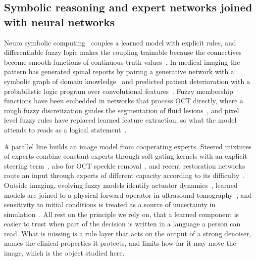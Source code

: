 \subsection{Symbolic reasoning and expert networks joined with neural networks}
Neuro symbolic computing~\cite{garcez2023neurosymbolic} couples a learned model with explicit rules,
and differentiable fuzzy logic makes the coupling trainable because the connectives become smooth
functions of continuous truth values~\cite{vankrieken2022analyzing}. In medical imaging the pattern
has generated spinal reports by pairing a generative network with a symbolic graph of domain
knowledge~\cite{han2021unifying} and predicted patient deterioration with a probabilistic logic
program over convolutional features~\cite{fadja2022neural}. Fuzzy membership
functions have been embedded in networks that process OCT directly, where a rough fuzzy
discretization guides the segmentation of fluid lesions~\cite{chen2023deep}, and pixel level fuzzy
rules have replaced learned feature extraction, so what the model attends to reads as a logical
statement~\cite{kim2025pixel}.

A parallel line builds an image model from cooperating experts. Steered mixtures of experts combine
constant experts through soft gating kernels with an explicit steering term~\cite{ozkan2023steered}, also for OCT speckle
removal~\cite{ozkan2024denoising}, and recent restoration networks route an input through experts of
different capacity according to its difficulty~\cite{zamfir2025complexity}. Outside imaging, evolving
fuzzy models identify actuator dynamics~\cite{precup2021evolving}, learned models are joined to a
physical forward operator in ultrasound tomography~\cite{fan2022model}, and sensitivity to initial
conditions is treated as a source of uncertainty in simulation~\cite{casquilho2025effect}. All rest
on the principle we rely on, that a learned component is easier to trust when part of the decision is
written in a language a person can read. What is missing is a rule layer that acts on the output of a strong denoiser,
names the clinical properties it protects, and limits how far it may move the image, which is the
object studied here.
